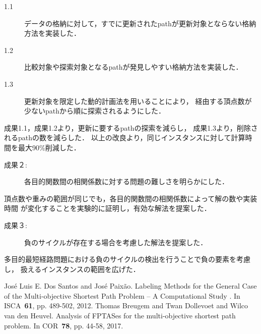 \documentclass[oneside, 10pt, twocolumn]{jarticle}
\begin{document}
\begin{description}
  \item[1.1]
  データの格納に対して，すでに更新されたpathが更新対象とならない格納方法を実装した．
\end{description}

\begin{description}
  \item[1.2]
  比較対象や探索対象となるpathが発見しやすい格納方法を実装した．
\end{description}

\begin{description}
  \item[1.3]
  更新対象を限定した動的計画法を用いることにより，
  経由する頂点数が少ないpathから順に探索されるようにした．
\end{description}

成果1.1，成果1.2より，更新に要するpathの探索を減らし，
成果1.3より，削除されるpathの数を減らした．
以上の改良より，同じインスタンスに対して計算時間を最大90\%削減した．

\begin{description}
  \item[成果２:]
  各目的関数間の相関係数に対する問題の難しさを明らかにした．
\end{description}

頂点数や重みの範囲が同じでも，各目的関数間の相関係数によって解の数や実装時間
が変化することを実験的に証明し，有効な解法を提案した．

\begin{description}
  \item[成果３:]
  負のサイクルが存在する場合を考慮した解法を提案した．
\end{description}

多目的最短経路問題における負のサイクルの検出を行うことで負の要素を考慮し，
扱えるインスタンスの範囲を広げた．

\begin{thebibliography}{9} %
   José Luis E. Dos Santos and José Paixão.
   Labeling Methods for the General Case of the Multi-objective
   Shortest Path Problem – A Computational Study
   . In ISCA~\textbf{61}, pp. 489-502,
   2012.
    Thomas Breugem and Twan Dollevoet and Wilco van den Heuvel.
    Analysis of FPTASes for the multi-objective shortest path problem.
    In COR~\textbf{78}, pp. 44-58,
    2017.

\end{thebibliography}
\end{document}
